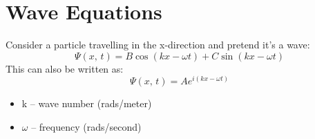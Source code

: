 \documentclass[a4paper, 11pt, normalem]{report}
\begin{document}
\section{Wave Equations}
Consider a particle travelling in the x-direction and pretend it's a wave:
\begin{equation}
    \Psi(x,\,t) = B\cos(kx - \omega t) + C\sin(kx - \omega t)
\end{equation}
This can also be written as:
\begin{equation}
    \Psi(x,\,t) = Ae^{i(kx - \omega t)}
\end{equation}
\begin{itemize}
    \item k -- wave number (rads/meter)
    \item $\omega$ -- frequency (rads/second)
\end{itemize}
\end{document}
